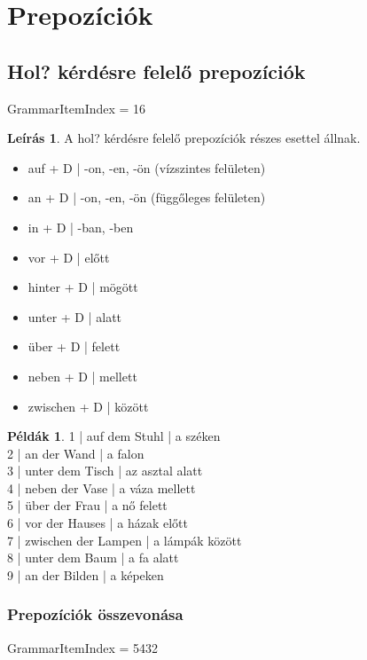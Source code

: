 \documentclass{article}
\theoremstyle{definition}
\newtheorem*{exmp}{Példák}
\newtheorem*{desc}{Leírás}
\begin{document}
\section{Prepozíciók}

\subsection{Hol? kérdésre felelő prepozíciók}

GrammarItemIndex = 16

\begin{desc}
A hol? kérdésre felelő prepozíciók részes esettel állnak.

\begin{itemize}
\item auf + D | -on, -en, -ön (vízszintes felületen)
\item an + D | -on, -en, -ön (függőleges felületen)
\item in + D | -ban, -ben
\item vor + D | előtt
\item hinter + D | mögött
\item unter + D | alatt
\item über + D | felett
\item neben + D | mellett
\item zwischen + D | között
\end{itemize}
\end{desc}

\begin{exmp}
1 | auf dem Stuhl | a széken\\
2 | an der Wand | a falon\\
3 | unter dem Tisch | az asztal alatt\\
4 | neben der Vase | a váza mellett\\
5 | über der Frau | a nő felett\\
6 | vor der Hauses | a házak előtt\\
7 | zwischen der Lampen | a lámpák között\\
8 | unter dem Baum | a fa alatt\\
9 | an der Bilden | a képeken\\
\end{exmp}

\subsubsection{Prepozíciók összevonása}

GrammarItemIndex = 5432
\end{document}
